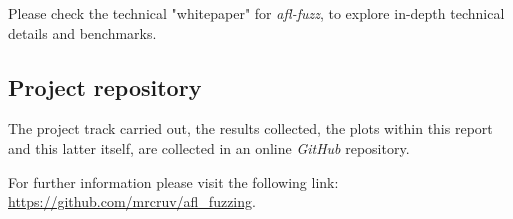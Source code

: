 Please check the technical "whitepaper" for \textit{afl-fuzz}\parencite{AFL_tech}, to explore in-depth technical details and benchmarks.

\subsection{Project repository}
The project track carried out, the results collected, the plots within this report and this latter itself, are collected in an online \textit{GitHub}\parencite{github} repository.

For further information please visit the following link: \href{https://github.com/mrcruv/afl_fuzzing}{https://github.com/mrcruv/afl\_fuzzing}.